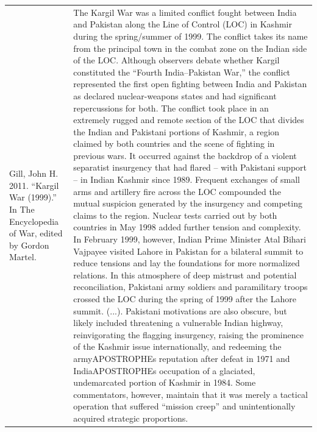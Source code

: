 {\begin{longtable}{p{}p{}}
Gill, John H. 2011. “Kargil War (1999).” In The Encyclopedia of War, edited by Gordon Martel. & The Kargil War was a limited conflict fought between India and Pakistan along the Line of Control (LOC) in Kashmir during the spring/summer of 1999. The conflict takes its name from the principal town in the combat zone on the Indian side of the LOC. Although observers debate whether Kargil constituted the “Fourth India–Pakistan War,” the conflict represented the first open fighting between India and Pakistan as declared nuclear-weapons states and had significant repercussions for both. The conflict took place in an extremely rugged and remote section of the LOC that divides the Indian and Pakistani portions of Kashmir, a region claimed by both countries and the scene of fighting in previous wars. It occurred against the backdrop of a violent separatist insurgency that had flared – with Pakistani support – in Indian Kashmir since 1989. Frequent exchanges of small arms and artillery fire across the LOC compounded the mutual suspicion generated by the insurgency and competing claims to the region. Nuclear tests carried out by both countries in May 1998 added further tension and complexity. In February 1999, however, Indian Prime Minister Atal Bihari Vajpayee visited Lahore in Pakistan for a bilateral summit to reduce tensions and lay the foundations for more normalized relations. In this atmosphere of deep mistrust and potential reconciliation, Pakistani army soldiers and paramilitary troops crossed the LOC during the spring of 1999 after the Lahore summit. (...). Pakistani motivations are also obscure, but likely included threatening a vulnerable Indian highway, reinvigorating the flagging insurgency, raising the prominence of the Kashmir issue internationally, and redeeming the armyAPOSTROPHEs reputation after defeat in 1971 and IndiaAPOSTROPHEs occupation of a glaciated, undemarcated portion of Kashmir in 1984. Some commentators, however, maintain that it was merely a tactical operation that suffered “mission creep” and unintentionally acquired strategic proportions.
\\

\end{longtable}}
